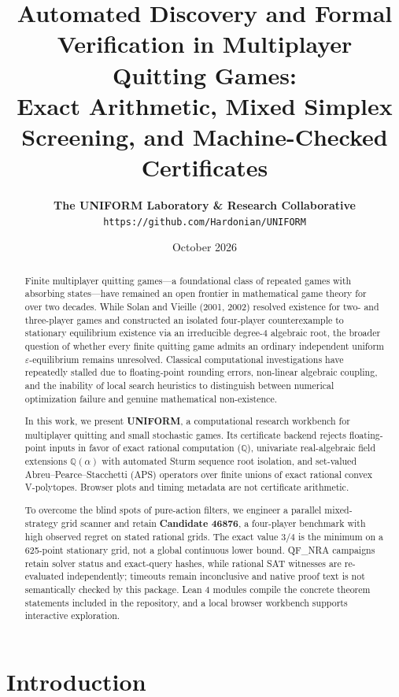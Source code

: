 \documentclass[11pt,a4paper]{article}
\title{\textbf{Automated Discovery and Formal Verification in Multiplayer Quitting Games:\\Exact Arithmetic, Mixed Simplex Screening, and Machine-Checked Certificates}}
\author{
  \textbf{The UNIFORM Laboratory \& Research Collaborative}\\
  \texttt{https://github.com/Hardonian/UNIFORM}
}
\date{October 2026}
\theoremstyle{definition}
\begin{document}
\maketitle

\begin{abstract}
Finite multiplayer quitting games---a foundational class of repeated games with absorbing states---have remained an open frontier in mathematical game theory for over two decades. While Solan and Vieille (2001, 2002) resolved existence for two- and three-player games and constructed an isolated four-player counterexample to stationary equilibrium existence via an irreducible degree-4 algebraic root, the broader question of whether every finite quitting game admits an ordinary independent uniform $\varepsilon$-equilibrium remains unresolved. Classical computational investigations have repeatedly stalled due to floating-point rounding errors, non-linear algebraic coupling, and the inability of local search heuristics to distinguish between numerical optimization failure and genuine mathematical non-existence.

In this work, we present \textbf{UNIFORM}, a computational research workbench for multiplayer quitting and small stochastic games. Its certificate backend rejects floating-point inputs in favor of exact rational computation ($\mathbb{Q}$), univariate real-algebraic field extensions $\mathbb{Q}(\alpha)$ with automated Sturm sequence root isolation, and set-valued Abreu--Pearce--Stacchetti (APS) operators over finite unions of exact rational convex V-polytopes. Browser plots and timing metadata are not certificate arithmetic.

To overcome the blind spots of pure-action filters, we engineer a parallel mixed-strategy grid scanner and retain \textbf{Candidate 46876}, a four-player benchmark with high observed regret on stated rational grids. The exact value $3/4$ is the minimum on a 625-point stationary grid, not a global continuous lower bound. QF\_NRA campaigns retain solver status and exact-query hashes, while rational SAT witnesses are re-evaluated independently; timeouts remain inconclusive and native proof text is not semantically checked by this package. Lean 4 modules compile the concrete theorem statements included in the repository, and a local browser workbench supports interactive exploration.
\end{abstract}

\section{Introduction}
\end{document}
